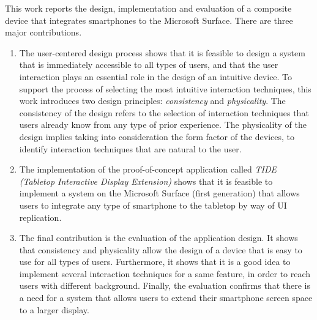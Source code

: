 This work reports the design, implementation and evaluation of a composite device that integrates smartphones to the Microsoft Surface.
There are three major contributions.

\begin{enumerate}

\item The user-centered design process shows that it is feasible to design a system that is immediately accessible to all types of users, and that the user interaction plays an essential role in the design of an intuitive device.
To support the process of selecting the most intuitive interaction techniques, this work introduces two design principles: \emph{consistency} and \emph{physicality}.
The consistency of the design refers to the selection of interaction techniques that users already know from any type of prior experience.
The physicality of the design implies taking into consideration the form factor of the devices, to identify interaction techniques that are natural to the user.

\item The implementation of the proof-of-concept application called \emph{TIDE (Tabletop Interactive Display Extension)} shows that it is feasible to implement a system on the Microsoft Surface (first generation) that allows users to integrate any type of smartphone to the tabletop by way of UI replication.

\item The final contribution is the evaluation of the application design.
It shows that consistency and physicality allow the design of a device that is easy to use for all types of users.
Furthermore, it shows that it is a good idea to implement several interaction techniques for a same feature, in order to reach users with different background.
Finally, the evaluation confirms that there is a need for a system that allows users to extend their smartphone screen space to a larger display.

\end{enumerate}

